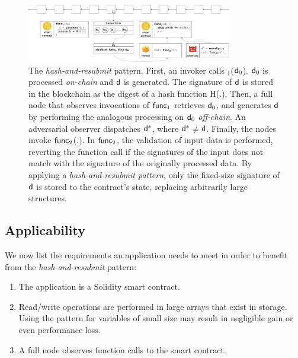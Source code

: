 \begin{figure}[h]
    \begin{center} \includegraphics[width=0.8\textwidth]{figures/har-pattern.pdf}
    \end{center}

    \caption{The \emph{hash-and-resubmit} pattern. First, an invoker calls
        \proc$_1$($\mathsf{d}_0$). $\mathsf{d}_0$ is processed \emph{on-chain} and
        $\mathsf{d}$ is generated. The signature of $\mathsf{d}$ is stored in the
        blockchain as the digest of a hash function \textsf{H}(.). Then,
        a full node that observes invocations of $\textsf{func}_1$ retrieves $\mathsf{d}_0$,
        and generates $\mathsf{d}$ by performing the analogous processing on
        $\mathsf{d}_0$ \emph{off-chain}. An adversarial observer dispatches
        $\mathsf{d^*}$, where $\mathsf{d^*}$$\neq$$\mathsf{d}$. Finally, the nodes invoke
        $\textsf{func}_2$(.). In $\textsf{func}_2$, the validation of input data is performed,
        reverting the function call if the signatures of the input does not
        match with the signature of the originally processed data. By applying
        a \emph{hash-and-resubmit pattern}, only the fixed-size signature of
        $\mathsf{d}$ is stored to the contract's state, replacing arbitrarily large
        structures.}

        \label{fig:har-pattern}
\end{figure}

\subsection{Applicability}
We now list the requirements an application needs to meet in order to benefit
from the \emph{hash-and-resubmit} pattern:

\begin{enumerate}
    \item The application is a Solidity smart contract.
    \item Read/write operations are performed in large arrays that exist in
        storage. Using the pattern for variables of small size may result in
        negligible gain or even performance loss.
    \item A full node observes function calls to the smart contract.
\end{enumerate}

